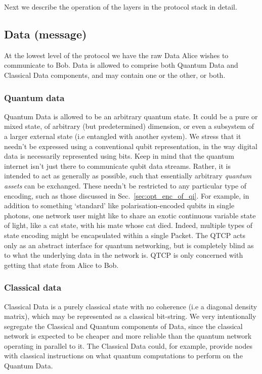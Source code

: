 \documentclass[aps,rmp,twocolumn,amsmath,amssymb,nofootinbib,superscriptaddress]{revtex4}
\begin{document}
Next we describe the operation of the layers in the protocol stack in detail.

%
%

\subsection{Data (message)}

At the lowest level of the protocol we have the raw {\sc Data} Alice wishes to communicate to Bob. {\sc Data} is allowed to comprise both {\sc Quantum Data} and {\sc Classical Data} components, and may contain one or the other, or both.

%
%

\subsubsection{Quantum data}

{\sc Quantum Data} is allowed to be an arbitrary quantum state. It could be a pure or mixed state, of arbitrary (but predetermined) dimension, or even a subsystem of a larger external state (i.e entangled with another system). We stress that it needn't be expressed using a conventional qubit representation, in the way digital data is necessarily represented using bits. Keep in mind that the quantum internet isn't just there to communicate qubit data streams. Rather, it is intended to act as generally as possible, such that essentially arbitrary \emph{quantum assets} can be exchanged. These needn't be restricted to any particular type of encoding, such as those discussed in Sec.~\ref{sec:opt_enc_of_qi}. For example, in addition to something `standard' like polarisation-encoded qubits in single photons, one network user might like to share an exotic continuous variable state of light, like a cat state, with his mate whose cat died. Indeed, multiple types of state encoding might be encapsulated within a single {\sc Packet}. The QTCP acts only as an abstract interface for quantum networking, but is completely blind as to what the underlying data in the network is. QTCP is only concerned with getting that state from Alice to Bob.

%
%

\subsubsection{Classical data}

{\sc Classical Data} is a purely classical state with no coherence (i.e a diagonal density matrix), which may be represented as a classical bit-string. We very intentionally segregate the {\sc Classical} and {\sc Quantum} components of {\sc Data}, since the classical network is expected to be cheaper and more reliable than the quantum network operating in parallel to it. The {\sc Classical Data} could, for example, provide nodes with classical instructions on what quantum computations to perform on the {\sc Quantum Data}.
\end{document}
